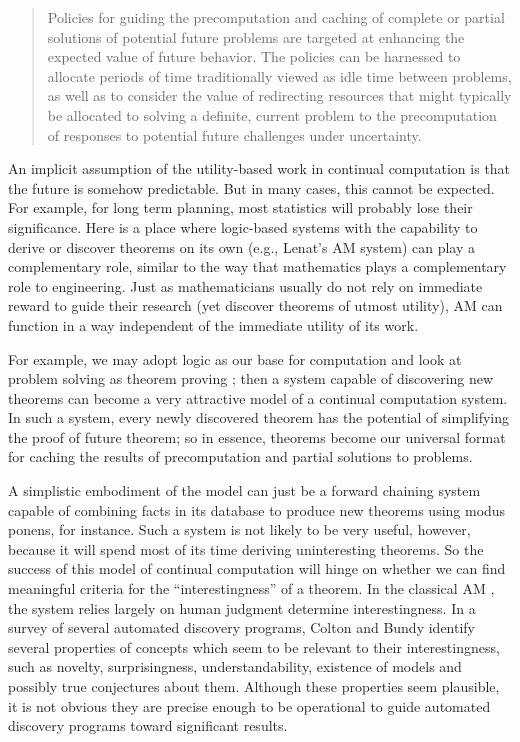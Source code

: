\documentclass{llncs}
\begin{document}
\begin{quotation}
  Policies for guiding the precomputation and caching of complete or
  partial solutions of potential future problems are targeted at enhancing
  the expected value of future behavior.  The policies can be harnessed to
  allocate periods of time traditionally viewed as idle time between
  problems, as well as to consider the value of redirecting resources that
  might typically be allocated to solving a definite, current problem to
  the precomputation of responses to potential future challenges under
  uncertainty\cite{horvitz2001:principles}.
\end{quotation}
An implicit assumption of the utility-based work in continual computation
is that the future is somehow predictable.  But in many cases, this cannot
be expected.  For example, for long term planning, most statistics will
probably lose their significance.  Here is a place where logic-based
systems with the capability to derive or discover theorems on its own
(e.g., Lenat's AM system) can play a complementary role, similar to the way
that mathematics plays a complementary role to engineering.  Just as
mathematicians usually do not rely on immediate reward to guide their
research (yet discover theorems of utmost utility), AM can function in a
way independent of the immediate utility of its work.

For example, we may adopt logic as our base for computation and look at
problem solving as theorem proving \cite{bibel1997:let_plan}; then a system
capable of discovering new theorems can become a very attractive model of a
continual computation system.  In such a system, every newly discovered
theorem has the potential of simplifying the proof of future theorem; so in
essence, theorems become our universal format for caching the results of
precomputation and partial solutions to problems.

A simplistic embodiment of the model can just be a forward chaining system
capable of combining facts in its database to produce new theorems using
modus ponens, for instance.  Such a system is not likely to be very useful,
however, because it will spend most of its time deriving uninteresting
theorems.  So the success of this model of continual computation will hinge
on whether we can find meaningful criteria for the {}``interestingness'' of
a theorem.  In the classical AM
\cite{lenat1982:am,lenat1983:theory_formation,lenat/brown1984:why_am}, the
system relies largely on human judgment determine interestingness.  In a
survey of several automated discovery programs, Colton and Bundy
\cite{colton/bundy1999:notion_interestingness} identify several properties
of concepts which seem to be relevant to their interestingness, such as
novelty, surprisingness, understandability, existence of models and
possibly true conjectures about them.  Although these properties seem
plausible, it is not obvious they are precise enough to be operational to
guide automated discovery programs toward significant results.
\end{document}
